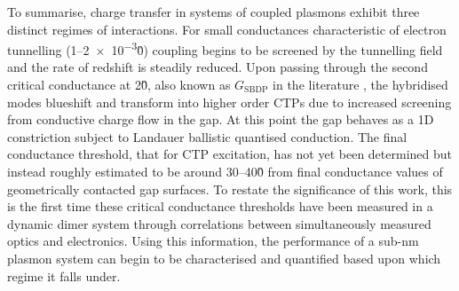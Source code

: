\documentclass[a4paper]{article}
\begin{document}
To summarise, charge transfer in systems of coupled plasmons exhibit three distinct regimes of interactions. For small conductances characteristic of electron tunnelling (1--\num{2e-3}\G0) coupling begins to be screened by the tunnelling field and the rate of redshift is steadily reduced. Upon passing through the second critical conductance at 2\G0, also known as $G_{\mathrm{SBDP}}$ in the literature \cite{perez2010, perez2011}, the hybridised modes blueshift and transform into higher order CTPs due to increased screening from conductive charge flow in the gap. At this point the gap behaves as a 1D constriction subject to Landauer ballistic quantised conduction. The final conductance threshold, that for CTP excitation, has not yet been determined but instead roughly estimated to be around 30--40\G0 from final conductance values of geometrically contacted gap surfaces. To restate the significance of this work, this is the first time these critical conductance thresholds have been measured in a dynamic dimer system through correlations between simultaneously measured optics and electronics. Using this information, the performance of a sub-nm plasmon system can begin to be characterised and quantified based upon which regime it falls under.


\end{document}
